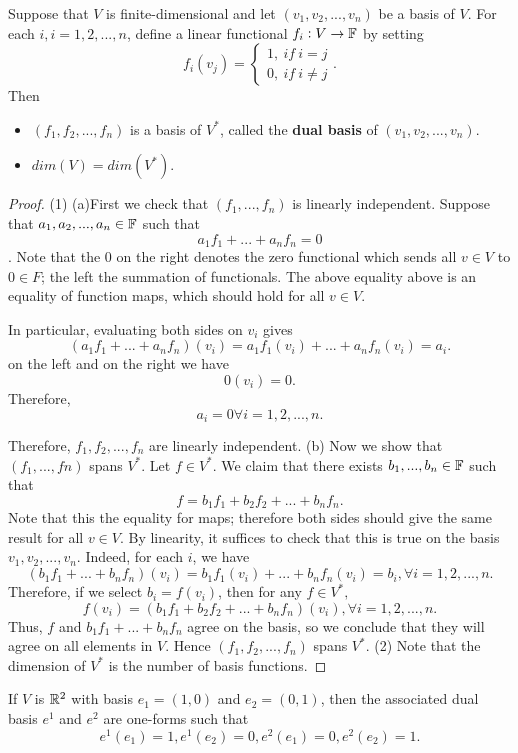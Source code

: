 \begin{refsection}
\begin{lemma}
Suppose that $V$ is finite-dimensional and let $(v_1,v_2,...,v_n)$ be a basis of $V$. For each $i,i=1,2,...,n$, define a linear functional $f_i: V\to \mathbb{F}$	by setting
$$f_i(v_j) = \begin{cases*}
1, ~if~i=j\\
0,~if~i\neq j
\end{cases*}.$$
Then 
\begin{itemize}
	\item $(f_1,f_2,...,f_n)$ is a basis of $V^*$, called the \textbf{dual basis} of $(v_1,v_2,...,v_n)$.
	\item $dim(V) = dim(V^*).$
\end{itemize}
\end{lemma}
\begin{proof}
(1)	
(a)First we check that $(f_1,...,f_n)$ is linearly independent. Suppose that $a_1,a_2,...,a_n\in \mathbb{F}$ such that
$$a_1f_1 + ... +a_nf_n = 0$$.
Note that the 0 on the right denotes the zero functional which sends
all $v\in V$ to  $0 \in F$; the left the summation of functionals. The above equality above is an equality of function maps, which should hold for all $v\in V$.

In particular, evaluating both sides on $v_i$ gives
$$(a_1f_1 +...+ a_nf_n)(v_i) = a_1f_1(v_i) +...+a_nf_n(v_i) = a_i.$$
on the left and on the right we have $$0(v_i) = 0.$$
Therefore, 
$$a_i = 0\forall i=1,2,...,n.$$

Therefore, $f_1,f_2,...,f_n$ are linearly independent.
(b) Now we show that $(f_1,...,fn)$ spans $V^*$. 
Let $f\in V^*$. We claim that there exists $b_1,...,b_n\in \mathbb{F}$ such that
$$f = b_1f_1+b_2f_2+...+b_nf_n.$$
Note that this the equality for maps; therefore both sides should give the same result for all $v\in V$.
By linearity, it suffices to check that this is true on the basis $v_1,v_2,...,v_n$. Indeed, for each $i$,
we have
$$(b_1f_1+...+b_nf_n)(v_i) = b_1f_1(v_i)+...+b_nf_n(v_i) = b_i, \forall i=1,2,...,n.$$
Therefore, if we select $b_i = f(v_i)$, then
for any $f\in V^*, $
$$f(v_i) = (b_1f_1+b_2f_2+...+b_nf_n)(v_i),\forall i=1,2,...,n.$$
Thus, $f$ and $b_1f_1 +...+b_nf_n$ agree on the basis, so
we conclude that they will agree on all elements in  $V$. Hence $(f_1,f_2,...,f_n)$ spans $V^*$.
(2) Note that the dimension of $V^*$ is the number of basis functions.
\end{proof}

\begin{example}
If $V$ is $\mathbb{R}^2$ with basis $e_1=(1,0)$ and $e_2=(0,1)$, then the associated dual basis $e^1$ and $e^2$ are one-forms such that $$e^1(e_1) = 1, e^1(e_2)=0,e^2(e_1)=0, e^2(e_2)=1.$$	
\end{example}


\end{refsection}
